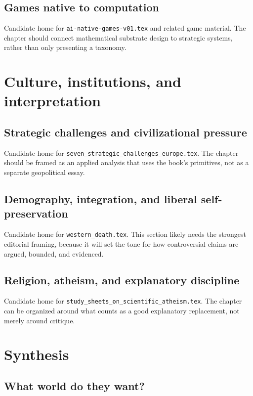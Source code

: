 \documentclass[11pt,twoside,openright]{book}
\begin{document}
\chapter{Games native to computation}

Candidate home for \texttt{ai-native-games-v01.tex} and related game material.
The chapter should connect mathematical substrate design to strategic systems,
rather than only presenting a taxonomy.

\part{Culture, institutions, and interpretation}

\chapter[Strategic challenges]{Strategic challenges and civilizational pressure}

Candidate home for \texttt{seven\_strategic\_challenges\_europe.tex}. The
chapter should be framed as an applied analysis that uses the book's primitives,
not as a separate geopolitical essay.

\chapter[Demography and integration]{Demography, integration, and liberal self-preservation}

Candidate home for \texttt{western\_death.tex}. This section likely needs the
strongest editorial framing, because it will set the tone for how controversial
claims are argued, bounded, and evidenced.

\chapter[Religion and explanatory discipline]{Religion, atheism, and explanatory discipline}

Candidate home for \texttt{study\_sheets\_on\_scientific\_atheism.tex}. The
chapter can be organized around what counts as a good explanatory replacement,
not merely around critique.

\part{Synthesis}

\chapter{What world do they want?}
\end{document}
